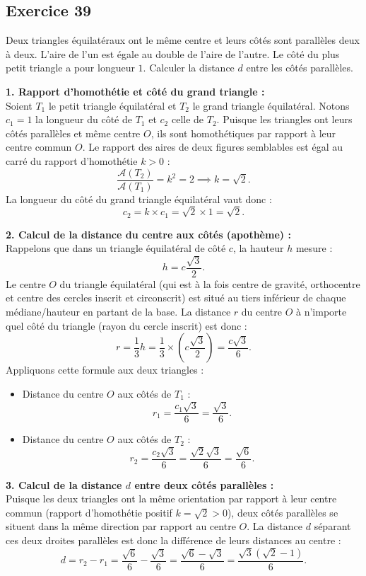 \documentclass[11pt,a4paper]{article}
\begin{document}
\subsection*{Exercice 39}
Deux triangles équilatéraux ont le même centre et leurs côtés sont parallèles deux à deux. L'aire de l'un est égale au double de l'aire de l'autre. Le côté du plus petit triangle a pour longueur $1$.
Calculer la distance $d$ entre les côtés parallèles.

\begin{correctionbox}
\textbf{1. Rapport d'homothétie et côté du grand triangle :}\\
Soient $T_1$ le petit triangle équilatéral et $T_2$ le grand triangle équilatéral.
Notons $c_1 = 1$ la longueur du côté de $T_1$ et $c_2$ celle de $T_2$.
Puisque les triangles ont leurs côtés parallèles et même centre $O$, ils sont homothétiques par rapport à leur centre commun $O$.
Le rapport des aires de deux figures semblables est égal au carré du rapport d'homothétie $k > 0$ :
\[
\frac{\mathcal{A}(T_2)}{\mathcal{A}(T_1)} = k^2 = 2 \implies k = \sqrt{2}.
\]
La longueur du côté du grand triangle équilatéral vaut donc :
\[
c_2 = k \times c_1 = \sqrt{2} \times 1 = \sqrt{2}.
\]

\textbf{2. Calcul de la distance du centre aux côtés (apothème) :}\\
Rappelons que dans un triangle équilatéral de côté $c$, la hauteur $h$ mesure :
\[
h = c \frac{\sqrt{3}}{2}.
\]
Le centre $O$ du triangle équilatéral (qui est à la fois centre de gravité, orthocentre et centre des cercles inscrit et circonscrit) est situé au tiers inférieur de chaque médiane/hauteur en partant de la base.
La distance $r$ du centre $O$ à n'importe quel côté du triangle (rayon du cercle inscrit) est donc :
\[
r = \frac{1}{3} h = \frac{1}{3} \times \left( c \frac{\sqrt{3}}{2} \right) = \frac{c\sqrt{3}}{6}.
\]
Appliquons cette formule aux deux triangles :
\begin{itemize}[leftmargin=*,label=\textbullet]
    \item Distance du centre $O$ aux côtés de $T_1$ :
    \[
    r_1 = \frac{c_1\sqrt{3}}{6} = \frac{\sqrt{3}}{6}.
    \]
    \item Distance du centre $O$ aux côtés de $T_2$ :
    \[
    r_2 = \frac{c_2\sqrt{3}}{6} = \frac{\sqrt{2}\sqrt{3}}{6} = \frac{\sqrt{6}}{6}.
    \]
\end{itemize}

\textbf{3. Calcul de la distance $d$ entre deux côtés parallèles :}\\
Puisque les deux triangles ont la même orientation par rapport à leur centre commun (rapport d'homothétie positif $k = \sqrt{2} > 0$), deux côtés parallèles se situent dans la même direction par rapport au centre $O$.
La distance $d$ séparant ces deux droites parallèles est donc la différence de leurs distances au centre :
\[
d = r_2 - r_1 = \frac{\sqrt{6}}{6} - \frac{\sqrt{3}}{6} = \frac{\sqrt{6} - \sqrt{3}}{6} = \frac{\sqrt{3}(\sqrt{2} - 1)}{6}.
\]


\end{correctionbox}
\end{document}
